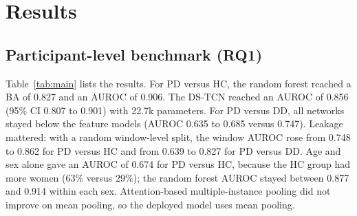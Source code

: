 \documentclass[preprint,12pt]{elsarticle}
\begin{document}
\section{Results}
\label{sec:results}
\subsection{Participant-level benchmark (RQ1)}
Table~\ref{tab:main} lists the results. For PD versus HC, the random forest reached a BA of 0.827 and an AUROC of 0.906. The DS-TCN reached an AUROC of 0.856 (95\% CI 0.807 to 0.901) with 22.7k parameters. For PD versus DD, all networks stayed below the feature models (AUROC 0.635 to 0.685 versus 0.747). Leakage mattered: with a random window-level split, the window AUROC rose from 0.748 to 0.862 for PD versus HC and from 0.639 to 0.827 for PD versus DD. Age and sex alone gave an AUROC of 0.674 for PD versus HC, because the HC group had more women (63\% versus 29\%); the random forest AUROC stayed between 0.877 and 0.914 within each sex. Attention-based multiple-instance pooling did not improve on mean pooling, so the deployed model uses mean pooling.
\end{document}
